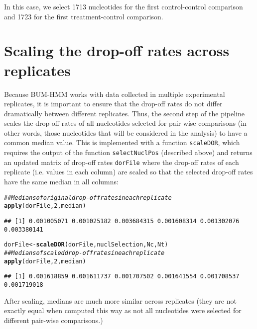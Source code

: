 \documentclass{article}\usepackage[]{graphicx}\usepackage[]{color}
\makeatletter
\newcommand{\hlnum}[1]{\textcolor[rgb]{0.686,0.059,0.569}{#1}}%
\newcommand{\hlcom}[1]{\textcolor[rgb]{0.678,0.584,0.686}{\textit{#1}}}%
\newcommand{\hlstd}[1]{\textcolor[rgb]{0.345,0.345,0.345}{#1}}%
\newcommand{\hlkwb}[1]{\textcolor[rgb]{0.69,0.353,0.396}{#1}}%
\newcommand{\hlkwd}[1]{\textcolor[rgb]{0.737,0.353,0.396}{\textbf{#1}}}%
\newenvironment{kframe}{%
 \def\at@end@of@kframe{}%
 \ifinner\ifhmode%
  \def\at@end@of@kframe{\end{minipage}}%
  \begin{minipage}{\columnwidth}%
 \fi\fi%
 \def\FrameCommand##1{\hskip\@totalleftmargin \hskip-\fboxsep
 \colorbox{shadecolor}{##1}\hskip-\fboxsep
     \hskip-\linewidth \hskip-\@totalleftmargin \hskip\columnwidth}%
 \MakeFramed {\advance\hsize-\width
   \@totalleftmargin\z@ \linewidth\hsize
   \@setminipage}}%
 {\par\unskip\endMakeFramed%
 \at@end@of@kframe}
\newenvironment{knitrout}{}{} %
\makeatother
\begin{document}
In this case, we select 1713 nucleotides
for the first control-control comparison and
1723 for the first treatment-control
comparison.

\section{Scaling the drop-off rates across replicates}

Because BUM-HMM works with data collected in multiple experimental replicates,
it is important to ensure that the drop-off rates do not differ dramatically
between different replicates. Thus, the second step of the pipeline scales the
drop-off rates of all nucleotides selected for pair-wise comparisons (in other
words, those nucleotides that will be considered in the analysis) to have a
common median value. This is implemented with a function \texttt{scaleDOR},
which requires the output of the function \texttt{selectNuclPos}
(described above) and returns an updated matrix of drop-off rates
\texttt{dorFile} where the drop-off rates of each replicate (i.e. values in each
column) are scaled so that the selected drop-off rates have the same median in
all columns:

\begin{knitrout}
\color{fgcolor}\begin{kframe}
\begin{alltt}
\hlcom{## Medians of original drop-off rates in each replicate}
\hlkwd{apply}\hlstd{(dorFile,} \hlnum{2}\hlstd{, median)}
\end{alltt}
\begin{verbatim}
## [1] 0.001005071 0.001025182 0.003684315 0.001608314 0.001302076 0.003380141
\end{verbatim}
\begin{alltt}
\hlstd{dorFile} \hlkwb{<-} \hlkwd{scaleDOR}\hlstd{(dorFile, nuclSelection, Nc, Nt)}
\hlcom{## Medians of scaled drop-off rates in each replicate}
\hlkwd{apply}\hlstd{(dorFile,} \hlnum{2}\hlstd{, median)}
\end{alltt}
\begin{verbatim}
## [1] 0.001618859 0.001611737 0.001707502 0.001641554 0.001708537 0.001719018
\end{verbatim}
\end{kframe}
\end{knitrout}

After scaling, medians are much more similar across replicates (they are not
exactly equal when computed this way as not all nucleotides were selected for
different pair-wise comparisons.)
\end{document}
